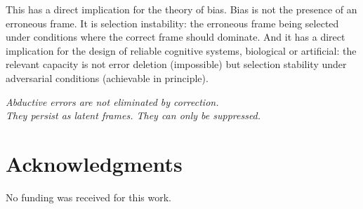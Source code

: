 \documentclass[12pt]{article}
\begin{document}
This has a direct implication for the theory of bias.
Bias is not the presence of an erroneous frame.
It is selection instability: the erroneous frame being selected
under conditions where the correct frame should dominate.
And it has a direct implication for the design of reliable
cognitive systems, biological or artificial: the relevant
capacity is not error deletion (impossible) but selection
stability under adversarial conditions (achievable in principle).

\medskip
\noindent
\textit{Abductive errors are not eliminated by correction.\\
They persist as latent frames. They can only be suppressed.}

\section*{Acknowledgments}

No funding was received for this work.
\end{document}
